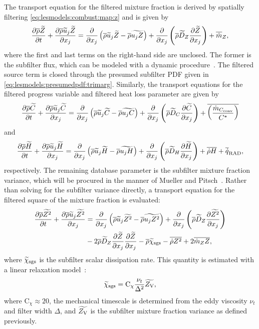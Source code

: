 The transport equation for the filtered mixture fraction is derived by spatially filtering \cref{eq:lesmodels:combust:map:z} and is given by
\begin{equation}\label{eq:lesmodels:presumedpdf:filteredz}
  \ftrder{\tf{Z}} = \dsff[\tf{Z}]{\tf{u_j Z}} + \fdt[Z]{\tf{Z}} + \fst[m]{Z},
\end{equation}
where the first and last terms on the right-hand side are unclosed. The former is the subfilter flux, which can be modeled with a dynamic procedure~\cite{germano1991,lilly1992,moin1991}. The filtered source term is closed through the presumed subfilter PDF given in \cref{eq:lesmodels:presumedpdf:trimarg}. Similarly, the transport equations for the filtered progress variable and filtered heat loss parameter are given by
\begin{equation}\label{eq:lesmodels:presumedpdf:filteredc}
  \ftrder{\tf{C}} = \dsff[\tf{C}]{\tf{u_j C}} + \fdt[C]{\tf{C}} + \mean{\left( \frac{\dot{m}_{C_{\text{conv}}}}{C^*} \right)}
\end{equation}
and
\begin{equation}\label{eq:lesmodels:presumedpdf:filteredh}
  \ftrder{\tf{H}} = \dsff[\tf{H}]{\tf{u_j H}} + \fdt[H]{\tf{H}} + \mean{\dot{\rho}H} + \fst[q]{\text{RAD}},
\end{equation}
respectively. The remaining database parameter is the subfilter mixture fraction variance, which will be procured in the manner of Mueller and Pitsch~\cite{mueller2012}. Rather than solving for the subfilter variance directly, a transport equation for the filtered square of the mixture fraction is evaluated:
\begin{equation}\label{eq:lesmodels:presumedpdf:filteredzsq}
  \begin{split}
    \ftrder{\tf{Z^2}} &= \dsff[\tf{Z^2}]{\tf{u_j Z^2}} + \fdt[Z]{\tf{Z^2}} \\
    &- 2\mean{\rho}\tf{D}_Z \pder[\tf{Z}]{x_j}\pder[\tf{Z}]{x_j} - \mean{\rho}\tf{\chi}_{\text{sgs}} - \mean{\dot{\rho}Z^2} + 2\mean{\dot{m}_Z Z},
  \end{split}
\end{equation}
where $\tf{\chi}_{\text{sgs}}$ is the subfilter scalar dissipation rate. This quantity is estimated with a linear relaxation model~\cite{ihme200890}:
\begin{equation}\label{eq:lesmodels:presumedpdf:chisgs}
  \tf{\chi}_{\text{sgs}} = \text{C}_{\chi}\frac{\nu_t}{\Delta^2}\tf{Z_{\text{V}}},
\end{equation}
where $\text{C}_{\chi} \approx 20$, the mechanical timescale is determined from the eddy viscosity $\nu_t$ and filter width $\Delta$, and $\tf{Z_{\text{V}}}$ is the subfilter mixture fraction variance as defined previously.
